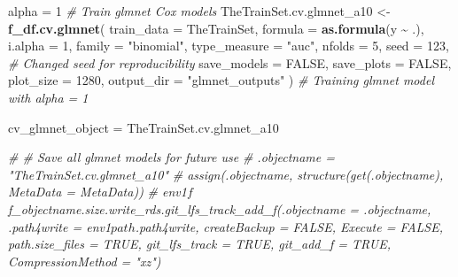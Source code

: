 \documentclass[
]{article}
\newenvironment{Shaded}{\begin{snugshade}}{\end{snugshade}}
\newcommand{\AttributeTok}[1]{\textcolor[rgb]{0.13,0.29,0.53}{#1}}
\newcommand{\CommentTok}[1]{\textcolor[rgb]{0.56,0.35,0.01}{\textit{#1}}}
\newcommand{\ConstantTok}[1]{\textcolor[rgb]{0.56,0.35,0.01}{#1}}
\newcommand{\DecValTok}[1]{\textcolor[rgb]{0.00,0.00,0.81}{#1}}
\newcommand{\FunctionTok}[1]{\textcolor[rgb]{0.13,0.29,0.53}{\textbf{#1}}}
\newcommand{\NormalTok}[1]{#1}
\newcommand{\OtherTok}[1]{\textcolor[rgb]{0.56,0.35,0.01}{#1}}
\newcommand{\SpecialCharTok}[1]{\textcolor[rgb]{0.81,0.36,0.00}{\textbf{#1}}}
\newcommand{\StringTok}[1]{\textcolor[rgb]{0.31,0.60,0.02}{#1}}
\begin{document}
\begin{Shaded}
\begin{Highlighting}[]

\NormalTok{alpha }\OtherTok{=} \DecValTok{1}
\CommentTok{\# Train glmnet Cox models}
\NormalTok{TheTrainSet.cv.glmnet\_a10 }\OtherTok{\textless{}{-}} \FunctionTok{f\_df.cv.glmnet}\NormalTok{(}
  \AttributeTok{train\_data =}\NormalTok{ TheTrainSet,}
  \AttributeTok{formula =} \FunctionTok{as.formula}\NormalTok{(y }\SpecialCharTok{\textasciitilde{}}\NormalTok{ .),}
  \AttributeTok{i.alpha =} \DecValTok{1}\NormalTok{,}
  \AttributeTok{family =} \StringTok{"binomial"}\NormalTok{,}
  \AttributeTok{type\_measure =} \StringTok{"auc"}\NormalTok{,}
  \AttributeTok{nfolds =} \DecValTok{5}\NormalTok{,}
  \AttributeTok{seed =} \DecValTok{123}\NormalTok{,  }\CommentTok{\# Changed seed for reproducibility}
  \AttributeTok{save\_models =} \ConstantTok{FALSE}\NormalTok{,}
  \AttributeTok{save\_plots =} \ConstantTok{FALSE}\NormalTok{,}
  \AttributeTok{plot\_size =} \DecValTok{1280}\NormalTok{,}
  \AttributeTok{output\_dir =} \StringTok{"glmnet\_outputs"}
\NormalTok{)}
\CommentTok{\# Training glmnet model with alpha = 1}

\NormalTok{cv\_glmnet\_object }\OtherTok{=}\NormalTok{ TheTrainSet.cv.glmnet\_a10}

\CommentTok{\# \# Save all glmnet models for future use}
\CommentTok{\# .objectname = "TheTrainSet.cv.glmnet\_a10"}
\CommentTok{\# assign(.objectname, structure(get(.objectname), MetaData = MetaData))}
\CommentTok{\# env1$f$f\_objectname.size.write\_rds.git\_lfs\_track\_add\_f(.objectname = .objectname, .path4write = env1$path$.path4write, createBackup = FALSE, Execute = FALSE, path.size\_files = TRUE, git\_lfs\_track = TRUE, git\_add\_f = TRUE, CompressionMethod = "xz")}


\end{Highlighting}
\end{Shaded}
\end{document}
